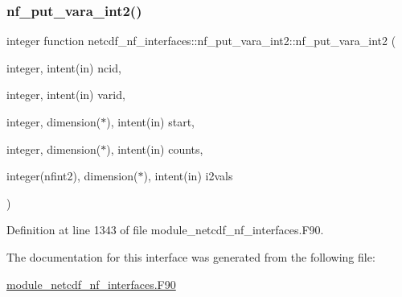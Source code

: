 \subsubsection{\texorpdfstring{nf\+\_\+put\+\_\+vara\+\_\+int2()}{nf\_put\_vara\_int2()}}
{\footnotesize\ttfamily integer function netcdf\+\_\+nf\+\_\+interfaces\+::nf\+\_\+put\+\_\+vara\+\_\+int2\+::nf\+\_\+put\+\_\+vara\+\_\+int2 (\begin{DoxyParamCaption}\item[{integer, intent(in)}]{ncid,  }\item[{integer, intent(in)}]{varid,  }\item[{integer, dimension($\ast$), intent(in)}]{start,  }\item[{integer, dimension($\ast$), intent(in)}]{counts,  }\item[{integer(nfint2), dimension($\ast$), intent(in)}]{i2vals }\end{DoxyParamCaption})}



Definition at line 1343 of file module\+\_\+netcdf\+\_\+nf\+\_\+interfaces.\+F90.



The documentation for this interface was generated from the following file\+:\begin{DoxyCompactItemize}
\item 
\hyperlink{module__netcdf__nf__interfaces_8F90}{module\+\_\+netcdf\+\_\+nf\+\_\+interfaces.\+F90}\end{DoxyCompactItemize}

